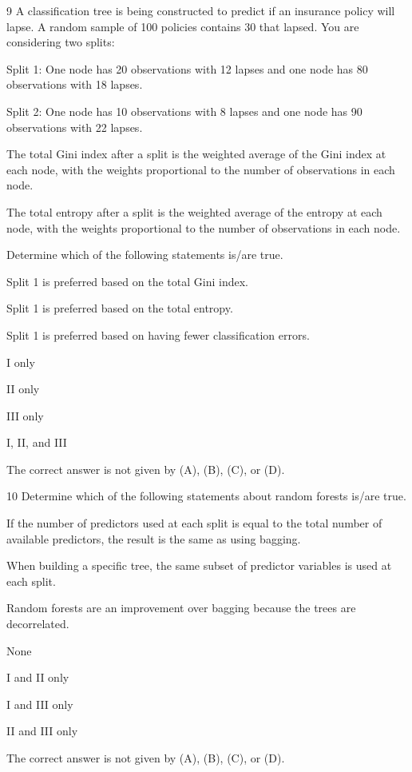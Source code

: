 \begin{question}{9}
A classification tree is being constructed to predict if an insurance policy will lapse. A random sample of 100 policies contains 30 that lapsed. You are considering two splits:

Split 1: One node has 20 observations with 12 lapses and one node has 80 observations with 18 lapses.

Split 2: One node has 10 observations with 8 lapses and one node has 90 observations with 22 lapses.

The total Gini index after a split is the weighted average of the Gini index at each node, with the weights proportional to the number of observations in each node.

The total entropy after a split is the weighted average of the entropy at each node, with the weights proportional to the number of observations in each node.

Determine which of the following statements is/are true.
\begin{statements}
\item Split 1 is preferred based on the total Gini index.
\item Split 1 is preferred based on the total entropy.
\item Split 1 is preferred based on having fewer classification errors.
\end{statements}

\begin{choices}
\item I only
\item II only
\item III only
\item I, II, and III
\item The correct answer is not given by (A), (B), (C), or (D).
\end{choices}
\end{question}

\begin{question}{10}
Determine which of the following statements about random forests is/are true.
\begin{statements}
\item If the number of predictors used at each split is equal to the total number of available predictors, the result is the same as using bagging.
\item When building a specific tree, the same subset of predictor variables is used at each split.
\item Random forests are an improvement over bagging because the trees are decorrelated.
\end{statements}

\begin{choices}
\item None
\item I and II only
\item I and III only
\item II and III only
\item The correct answer is not given by (A), (B), (C), or (D).
\end{choices}
\end{question}

